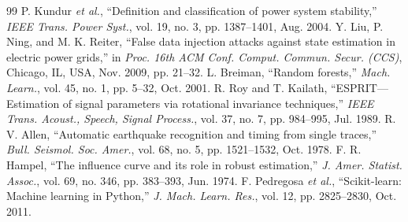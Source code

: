 \documentclass[12pt,letterpaper]{article}
\begin{document}
\begin{thebibliography}{99}\small\linespread{1.1}\selectfont
{} P. Kundur \emph{et al.}, ``Definition and classification of power system stability,'' \emph{IEEE Trans. Power Syst.}, vol. 19, no. 3, pp. 1387--1401, Aug. 2004.
 Y. Liu, P. Ning, and M. K. Reiter, ``False data injection attacks against state estimation in electric power grids,'' in \emph{Proc. 16th ACM Conf. Comput. Commun. Secur. (CCS)}, Chicago, IL, USA, Nov. 2009, pp. 21--32.
 L. Breiman, ``Random forests,'' \emph{Mach. Learn.}, vol. 45, no. 1, pp. 5--32, Oct. 2001.
 R. Roy and T. Kailath, ``ESPRIT---Estimation of signal parameters via rotational invariance techniques,'' \emph{IEEE Trans. Acoust., Speech, Signal Process.}, vol. 37, no. 7, pp. 984--995, Jul. 1989.
 R. V. Allen, ``Automatic earthquake recognition and timing from single traces,'' \emph{Bull. Seismol. Soc. Amer.}, vol. 68, no. 5, pp. 1521--1532, Oct. 1978.
 F. R. Hampel, ``The influence curve and its role in robust estimation,'' \emph{J. Amer. Statist. Assoc.}, vol. 69, no. 346, pp. 383--393, Jun. 1974.
 F. Pedregosa \emph{et al.}, ``Scikit-learn: Machine learning in Python,'' \emph{J. Mach. Learn. Res.}, vol. 12, pp. 2825--2830, Oct. 2011.
\end{thebibliography}
\end{document}
